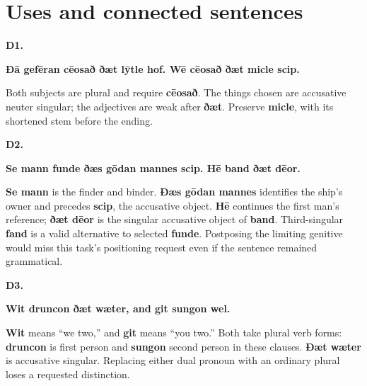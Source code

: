 \section*{Uses and connected sentences}

\par\begin{minipage}{\linewidth}\raggedright
\textbf{D1.}

\textbf{Ðā gefēran cēosað ðæt lȳtle hof. Wē cēosað ðæt micle scip.}

Both subjects are plural and require \textbf{cēosað}. The things chosen are accusative neuter singular; the adjectives are weak after \textbf{ðæt}. Preserve \textbf{micle}, with its shortened stem before the ending.

\end{minipage}\par\addvspace{4pt}

\par\begin{minipage}{\linewidth}\raggedright
\textbf{D2.}

\textbf{Se mann funde ðæs gōdan mannes scip. Hē band ðæt dēor.}

\textbf{Se mann} is the finder and binder. \textbf{Ðæs gōdan mannes} identifies the ship's owner and precedes \textbf{scip}, the accusative object. \textbf{Hē} continues the first man's reference; \textbf{ðæt dēor} is the singular accusative object of \textbf{band}. Third-singular \textbf{fand} is a valid alternative to selected \textbf{funde}. Postposing the limiting genitive would miss this task's positioning request even if the sentence remained grammatical.

\end{minipage}\par\addvspace{4pt}

\par\begin{minipage}{\linewidth}\raggedright
\textbf{D3.}

\textbf{Wit druncon ðæt wæter, and git sungon wel.}

\textbf{Wit} means “we two,” and \textbf{git} means “you two.” Both take plural verb forms: \textbf{druncon} is first person and \textbf{sungon} second person in these clauses. \textbf{Ðæt wæter} is accusative singular. Replacing either dual pronoun with an ordinary plural loses a requested distinction.

\end{minipage}\par\addvspace{4pt}

